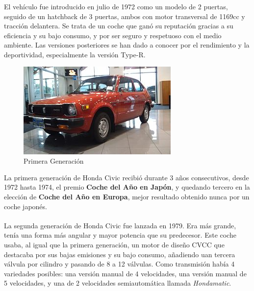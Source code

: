 \documentclass[10pt,a4paper]{report}
\begin{document}
El vehículo fue introducido en julio de 1972 como un modelo de 2 puertas, seguido de un hatchback de 3 puertas, ambos con motor transversal de 1169cc y tracción delantera.
Se trata de un coche que ganó su reputación gracias a su eficiencia y su bajo consumo, y por ser seguro y respetuoso con el medio ambiente. Las versiones posteriores se han dado a conocer por el rendimiento y la deportividad, especialmente la versión Type-R.
\\
\begin{figure}
  \begin{center}
    \includegraphics[scale=.45]{civic1.jpg}
  \end{center}
  \caption{Primera Generación}
\end{figure}
La primera generación de Honda Civic recibió durante 3 años consecutivos, desde 1972 hasta 1974, el premio \textbf{Coche del Año en Japón}, y quedando tercero en la elección de \textbf{Coche del Año en Europa}, mejor resultado obtenido nunca por un coche japonés.
\\ \\
La segunda generación de Honda Civic fue lanzada en 1979. Era más grande, tenía una forma más angular y mayor potencia que su predecesor.
Este coche usaba, al igual que la primera generación, un motor de diseño CVCC que destacaba por sus bajas emisiones y su bajo consumo, añadiendo uan tercera válvula por cilindro y pasando de 8 a 12 válvulas.
Como transmisión había 4 variedades posibles: una versión manual de 4 velocidades, una versión manual de 5 velocidades, y una de 2 velocidades semiautomática llamada \textit{Hondamatic}.
\\
\end{document}
